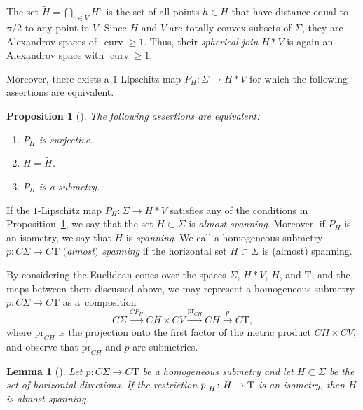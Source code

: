 \documentclass[pdftex]{sigma}
\numberwithin{equation}{section}
\newtheorem{lem}[thm]{Lemma}
\newtheorem{prop}[thm]{Proposition}
\theoremstyle{definition}
\DeclareMathOperator{\curv}{curv}
\newcommand{\Tau}{\mathrm{T}}
\newcommand\restr[2]{{%
		\left.\kern-\nulldelimiterspace %
		#1 %
		\right|_{#2} %
}}
\begin{document}
The set $\widetilde{H}= \bigcap_{v\in V} H^v$ is the set of all points $h\in H$ that have distance equal to $\pi/2$ to any point in $V$. %
Since $H$ and $V$ are totally convex subsets of $\Sigma$, they are Alexandrov spaces of~${\curv \geq 1}$. Thus, their \emph{spherical join} $H*V$ is again an Alexandrov space with $\curv\geq 1$.

Moreover, there exists a $1$-Lipschitz map $P_{H}\colon \Sigma \to H\ast V$ for which the following assertions are equivalent.
	


\begin{prop}[]
\label{P:LYTCHAK_SPANNING_SUBMETRY}
The following assertions are equivalent:
\begin{enumerate}\itemsep=0pt
\item[$(1)$] $P_H$ is surjective.
\item[$(2)$] $H = \widetilde{H}$.
\item[$(3)$] $P_H$ is a submetry.
\end{enumerate}
\end{prop}

If the $1$-Lipschitz map $P_H\colon \Sigma\to H\ast V$ satisfies any of the conditions in Proposition~\ref{P:LYTCHAK_SPANNING_SUBMETRY}, we say that the set $H\subset \Sigma$ is \emph{almost spanning}. Moreover, if $P_{H}$ is an isometry, we say that $H$ is \emph{spanning}. We call a homogeneous submetry $p\colon C\Sigma\to C\Tau$ \emph{$($almost$)$ spanning} if the horizontal set $H\subset \Sigma$ is (almost) spanning.
	
By considering the Euclidean cones over the spaces $\Sigma$, $H\ast V$, $H$, and $\Tau$, and the maps between them discussed above, we may represent a homogeneous submetry $p\colon C\Sigma\to C\Tau$ as a~composition
\[
	C\Sigma \overset{CP_H}{\longrightarrow} CH\times CV \overset{\mathrm{pr}_{CH}}{\longrightarrow} CH\overset{p}{\longrightarrow} C\Tau,
\]
where $\mathrm{pr}_{CH}$ is the projection onto the first factor of the metric product $CH\times CV$, and observe that $\mathrm{pr}_{CH}$ and $p$ are submetries.

\begin{lem}[]
\label{L: submetry restricted to horizontal part is an isometry implies space of directions splits into horizontal and vertical}
Let $p\colon C\Sigma\to C\Tau$ be a homogeneous submetry and let $H\subset \Sigma$ be the set of horizontal directions.
If the restriction $\restr{p}{H}\colon H\to \Tau$ is an isometry, then $H$ is almost-spanning.
\end{lem}
	
\end{document}
